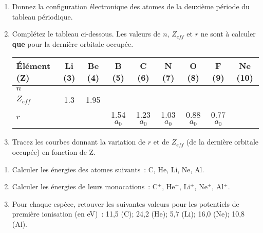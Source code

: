 \begin{enumerate}[\bf 1)]
\item Donnez la configuration \'electronique des atomes de la deuxi\`eme p\'eriode du tableau p\'eriodique.
\item Compl\'etez le tableau ci-dessous. Les valeurs de $n$, $Z_{eff}$ et $r$ ne sont \`a calculer \textbf{que} pour 
la derni\`ere orbitale occup\'ee.


\vrule

\begin{tabular}{p{3cm}|c|c|c|c|c|c|c|c}
\hline
\textbf{\'El\'ement (Z)}                               & Li (3) & Be (4) & B (5) & C (6) & N (7) & O (8) & F (9) & Ne (10) \\
\hline
$n$        &&&&&&&&\\\hline
$Z_{eff}$  & 1.3    & 1.95   &&&&&&\\\hline
$r$        &        &        & 1.54 $a_0$ & 1.23 $a_0$ & 1.03 $a_0$ & 0.88 $a_0$& 0.77 $a_0$&\\
\hline
\end{tabular}

\vrule

\item Tracez les courbes donnant la variation de $r$ et de $Z_{eff}$ 
(de la derni\`ere orbitale occup\'ee) en fonction de Z. 
\end{enumerate}
\begin{enumerate}[\bf 1)]
\item Calculer les \'energies des atomes suivants~: C, He, Li, Ne, Al.
\item Calculer les \'energies de leurs monocations~: C$^+$, He$^+$, Li$^+$, Ne$^+$, Al$^+$.
\item Pour chaque esp\`ece, retouver les suivantes valeurs pour les potentiels de premi\`ere ionisation (en eV)~:
11,5 (C); 24,2 (He); 5,7 (Li); 16,0 (Ne); 10,8 (Al).
\end{enumerate}
